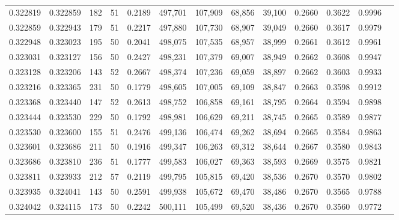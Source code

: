 \begin{tabular}{rrrrrrrrrrrrr}
0.322819 & 0.322859 &   182 &  51 &                                     0.2189 & 497,701 & 107,909 &  68,856 &  39,100 & 0.2660 & 0.3622 & 0.9996 \\
0.322859 & 0.322943 &   179 &  51 &                                     0.2217 & 497,880 & 107,730 &  68,907 &  39,049 & 0.2660 & 0.3617 & 0.9979 \\
0.322948 & 0.323023 &   195 &  50 &                                     0.2041 & 498,075 & 107,535 &  68,957 &  38,999 & 0.2661 & 0.3612 & 0.9961 \\
0.323031 & 0.323127 &   156 &  50 &                                     0.2427 & 498,231 & 107,379 &  69,007 &  38,949 & 0.2662 & 0.3608 & 0.9947 \\
0.323128 & 0.323206 &   143 &  52 &                                     0.2667 & 498,374 & 107,236 &  69,059 &  38,897 & 0.2662 & 0.3603 & 0.9933 \\
0.323216 & 0.323365 &   231 &  50 &                                     0.1779 & 498,605 & 107,005 &  69,109 &  38,847 & 0.2663 & 0.3598 & 0.9912 \\
0.323368 & 0.323440 &   147 &  52 &                                     0.2613 & 498,752 & 106,858 &  69,161 &  38,795 & 0.2664 & 0.3594 & 0.9898 \\
0.323444 & 0.323530 &   229 &  50 &                                     0.1792 & 498,981 & 106,629 &  69,211 &  38,745 & 0.2665 & 0.3589 & 0.9877 \\
0.323530 & 0.323600 &   155 &  51 &                                     0.2476 & 499,136 & 106,474 &  69,262 &  38,694 & 0.2665 & 0.3584 & 0.9863 \\
0.323601 & 0.323686 &   211 &  50 &                                     0.1916 & 499,347 & 106,263 &  69,312 &  38,644 & 0.2667 & 0.3580 & 0.9843 \\
0.323686 & 0.323810 &   236 &  51 &                                     0.1777 & 499,583 & 106,027 &  69,363 &  38,593 & 0.2669 & 0.3575 & 0.9821 \\
0.323811 & 0.323933 &   212 &  57 &                                     0.2119 & 499,795 & 105,815 &  69,420 &  38,536 & 0.2670 & 0.3570 & 0.9802 \\
0.323935 & 0.324041 &   143 &  50 &                                     0.2591 & 499,938 & 105,672 &  69,470 &  38,486 & 0.2670 & 0.3565 & 0.9788 \\
0.324042 & 0.324115 &   173 &  50 &                                     0.2242 & 500,111 & 105,499 &  69,520 &  38,436 & 0.2670 & 0.3560 & 0.9772 \\

\end{tabular}
